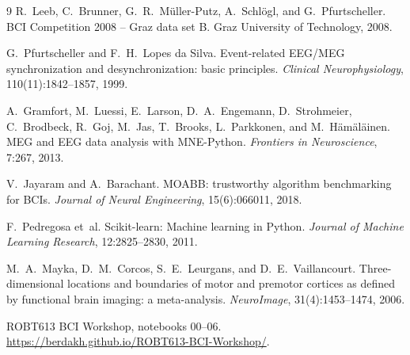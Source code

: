 \documentclass[11pt,a4paper]{article}
\begin{document}
\begin{thebibliography}{9}\small
{}
R.~Leeb, C.~Brunner, G.~R.~M\"uller-Putz, A.~Schl\"ogl, and G.~Pfurtscheller.
\newblock BCI Competition 2008 -- Graz data set B.
\newblock Graz University of Technology, 2008.

G.~Pfurtscheller and F.~H.~Lopes da Silva.
\newblock Event-related EEG/MEG synchronization and desynchronization: basic principles.
\newblock \emph{Clinical Neurophysiology}, 110(11):1842--1857, 1999.

A.~Gramfort, M.~Luessi, E.~Larson, D.~A.~Engemann, D.~Strohmeier, C.~Brodbeck, R.~Goj, M.~Jas, T.~Brooks, L.~Parkkonen, and M.~H\"am\"al\"ainen.
\newblock MEG and EEG data analysis with MNE-Python.
\newblock \emph{Frontiers in Neuroscience}, 7:267, 2013.

V.~Jayaram and A.~Barachant.
\newblock MOABB: trustworthy algorithm benchmarking for BCIs.
\newblock \emph{Journal of Neural Engineering}, 15(6):066011, 2018.

F.~Pedregosa et~al.
\newblock Scikit-learn: Machine learning in Python.
\newblock \emph{Journal of Machine Learning Research}, 12:2825--2830, 2011.

M.~A.~Mayka, D.~M.~Corcos, S.~E.~Leurgans, and D.~E.~Vaillancourt.
\newblock Three-dimensional locations and boundaries of motor and premotor cortices as defined by functional brain imaging: a meta-analysis.
\newblock \emph{NeuroImage}, 31(4):1453--1474, 2006.

ROBT613 BCI Workshop, notebooks 00--06.
\newblock \url{https://berdakh.github.io/ROBT613-BCI-Workshop/}.
\end{thebibliography}
\end{document}
